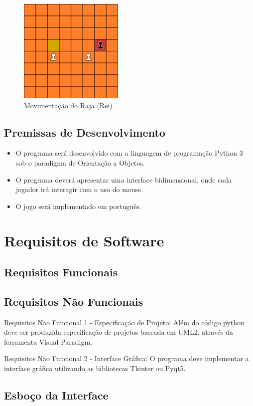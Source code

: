 \documentclass{article}
\begin{document}
    \begin{figure}[h]
    \centering
    \includegraphics[width=5cm]{imgs/padati_moves.png}
    \caption{Movimentação do Raja (Rei)}
    \label{figura:raja_moves}
    \end{figure}

\subsection{Premissas de Desenvolvimento}
    \begin{itemize}
        \item O programa será desenvolvido com a linguagem de programação Python 3 sob o paradigma de Orientação a Objetos.
        
        \item O programa deverá apresentar uma interface bidimensional, onde cada jogador irá interagir com o uso do mouse.
        
        \item O jogo será implementado em português.
        
    \end{itemize}
    
\section{Requisitos de Software}

\subsection{Requisitos Funcionais}

\subsection{Requisitos Não Funcionais}

    Requisitos Não Funcional 1 - Especificação de Projeto: 
    Além do código python deve ser produzida especificação de projetos baseada em UML2, através da ferramenta Visual Paradigm.
    
    Requisitos Não Funcional 2 - Interface Gráfica:
    O programa deve implementar a interface gráfica utilizando as bibliotecas Tkinter ou Pyqt5.

\subsection{Esboço da Interface}

    

    
\end{document}
